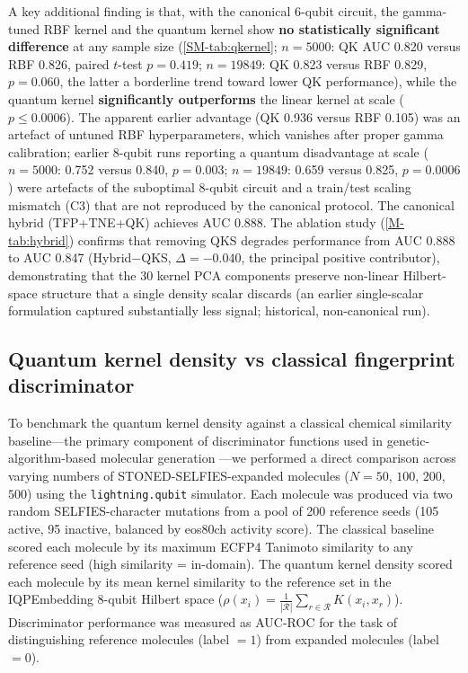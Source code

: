 \documentclass[11pt,a4paper]{article}
\begin{document}
A key additional finding is that, with the canonical 6-qubit circuit, the gamma-tuned RBF kernel and the quantum kernel show \textbf{no statistically significant difference} at any sample size (\cref{SM-tab:qkernel}; $n = \num{5000}$: QK AUC \num{0.820} versus RBF \num{0.826}, paired $t$-test $p = \num{0.419}$; $n = \num{19849}$: QK \num{0.823} versus RBF \num{0.829}, $p = \num{0.060}$, the latter a borderline trend toward lower QK performance), while the quantum kernel \textbf{significantly outperforms} the linear kernel at scale ($p \leq \num{0.0006}$). The apparent earlier advantage (QK \num{0.936} versus RBF \num{0.105}) was an artefact of untuned RBF hyperparameters, which vanishes after proper gamma calibration; earlier 8-qubit runs reporting a quantum disadvantage at scale ($n = \num{5000}$: \num{0.752} versus \num{0.840}, $p = \num{0.003}$; $n = \num{19849}$: \num{0.659} versus \num{0.825}, $p = \num{0.0006}$) were artefacts of the suboptimal 8-qubit circuit and a train/test scaling mismatch (C3) that are not reproduced by the canonical protocol. The canonical hybrid (TFP+TNE+QK) achieves AUC \num{0.888}. The ablation study (\cref{M-tab:hybrid}) confirms that removing QKS degrades performance from AUC \num{0.888} to AUC \num{0.847} (Hybrid$-$QKS, $\Delta = -\num{0.040}$, the principal positive contributor), demonstrating that the 30 kernel PCA components preserve non-linear Hilbert-space structure that a single density scalar discards (an earlier single-scalar formulation captured substantially less signal; historical, non-canonical run).



\subsection{Quantum kernel density vs classical fingerprint discriminator}


To benchmark the quantum kernel density against a classical chemical similarity baseline---the primary component of discriminator functions used in genetic-algorithm-based molecular generation \citep{jensen2019augmenting}---we performed a direct comparison across varying numbers of STONED-SELFIES-expanded molecules ($N = 50$, $100$, $200$, $500$) using the \texttt{lightning.qubit} simulator. Each molecule was produced via two random SELFIES-character mutations from a pool of \num{200} reference seeds (\num{105} active, \num{95} inactive, balanced by eos80ch activity score). The classical baseline scored each molecule by its maximum ECFP4 Tanimoto similarity to any reference seed (high similarity = in-domain). The quantum kernel density scored each molecule by its mean kernel similarity to the reference set in the IQPEmbedding 8-qubit Hilbert space ($\rho(x_i) = \frac{1}{|\mathcal{R}|}\sum_{r \in \mathcal{R}} K(x_i, x_r)$). Discriminator performance was measured as AUC-ROC for the task of distinguishing reference molecules (label $= 1$) from expanded molecules (label $= 0$).
\end{document}
